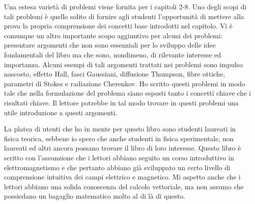 Una estesa varietà di problemi viene fornita per i capitoli 2-8. Uno degli scopi di tali problemi è quello solito di fornire agli studenti l'opportunità di mettere alla prova la propria comprensione dei concetti base introdotti nel capitolo. Vi è comunque un altro importante scopo aggiuntivo per alcuni dei problemi: presentare argomenti che non sono essenziali per lo sviluppo delle idee fondamentali del libro ma che sono, nondimeno, di rilevante interesse ed importanza. Alcuni esempi di tali argomenti trattati nei problemi sono impulso nascosto, effetto Hall, fasci Gaussiani, diffusione Thompson, fibre ottiche, parametri di Stokes e radiazione Cherenkov. Ho scritto questi problemi in modo tale che nella formulazione del problema siano esposti tanto i concetti chiave che i risultati chiave. Il lettore potrebbe in tal modo trovare in questi problemi una utile introduzione a questi argomenti.

La platea di utenti che ho in mente per questo libro sono studenti laureati in fisica teorica, sebbene io spero che anche studenti in fisica sperimentale, non laureati ed altri ancora possano trovare il libro di loro interesse. Questo libro è scritto con l'assunzione che i lettori abbiano seguito un corso introduttivo in elettromagnetismo e che pertanto abbiano già sviluppato un certo livello di comprensione intuitiva dei campi elettrico e magnetico. Mi aspetto anche che i lettori abbiano una solida conoscenza del calcolo vettoriale, ma non assumo che possiedano un bagaglio matematico molto al di là di questo.

